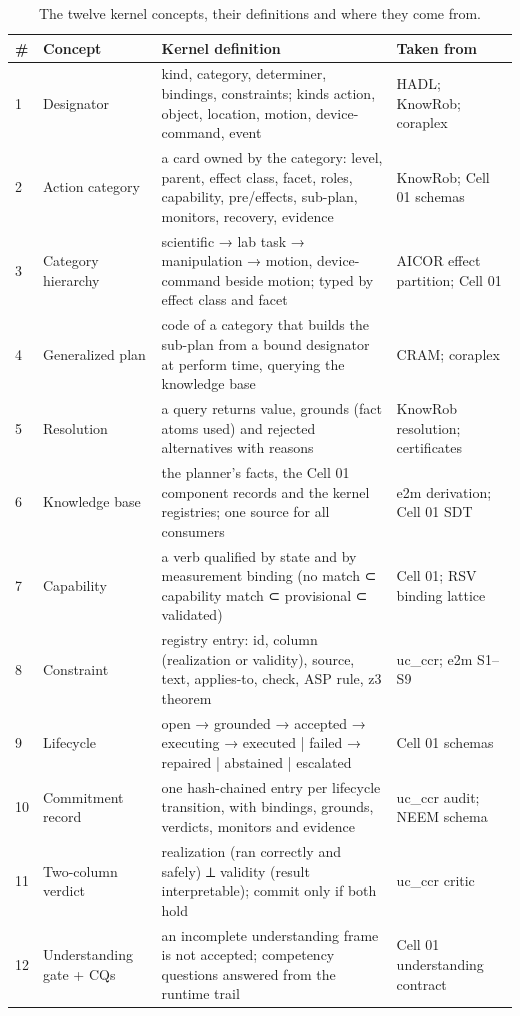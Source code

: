 \documentclass[10pt,a4paper]{article}
\begin{document}
\begin{table}[tbp]\centering\small
\caption{The twelve kernel concepts, their definitions and where they come from.}\label{tab:concepts}
\begin{tabularx}{\linewidth}{lp{2.6cm}Xp{3.1cm}}\toprule
\textbf{\#} & \textbf{Concept} & \textbf{Kernel definition} & \textbf{Taken from} \\\midrule
1 & Designator & kind, category, determiner, bindings, constraints; kinds action, object, location, motion, device-command, event & HADL; KnowRob; coraplex \\
2 & Action category & a card owned by the category: level, parent, effect class, facet, roles, capability, pre/effects, sub-plan, monitors, recovery, evidence & KnowRob; Cell 01 schemas \\
3 & Category hierarchy & scientific → lab task → manipulation → motion, device-command beside motion; typed by effect class and facet & AICOR effect partition; Cell 01 \\
4 & Generalized plan & code of a category that builds the sub-plan from a bound designator at perform time, querying the knowledge base & CRAM; coraplex \\
5 & Resolution & a query returns value, grounds (fact atoms used) and rejected alternatives with reasons & KnowRob resolution; certificates \\
6 & Knowledge base & the planner's facts, the Cell 01 component records and the kernel registries; one source for all consumers & e2m derivation; Cell 01 SDT \\
7 & Capability & a verb qualified by state and by measurement binding (no match ⊂ capability match ⊂ provisional ⊂ validated) & Cell 01; RSV binding lattice \\
8 & Constraint & registry entry: id, column (realization or validity), source, text, applies-to, check, ASP rule, z3 theorem & uc\_\allowbreak{}ccr; e2m S1–S9 \\
9 & Lifecycle & open → grounded → accepted → executing → executed | failed → repaired | abstained | escalated & Cell 01 schemas \\
10 & Commitment record & one hash-chained entry per lifecycle transition, with bindings, grounds, verdicts, monitors and evidence & uc\_\allowbreak{}ccr audit; NEEM schema \\
11 & Two-column verdict & realization (ran correctly and safely) ⟂ validity (result interpretable); commit only if both hold & uc\_\allowbreak{}ccr critic \\
12 & Understanding gate + CQs & an incomplete understanding frame is not accepted; competency questions answered from the runtime trail & Cell 01 understanding contract \\\bottomrule
\end{tabularx}
\end{table}
\end{document}
